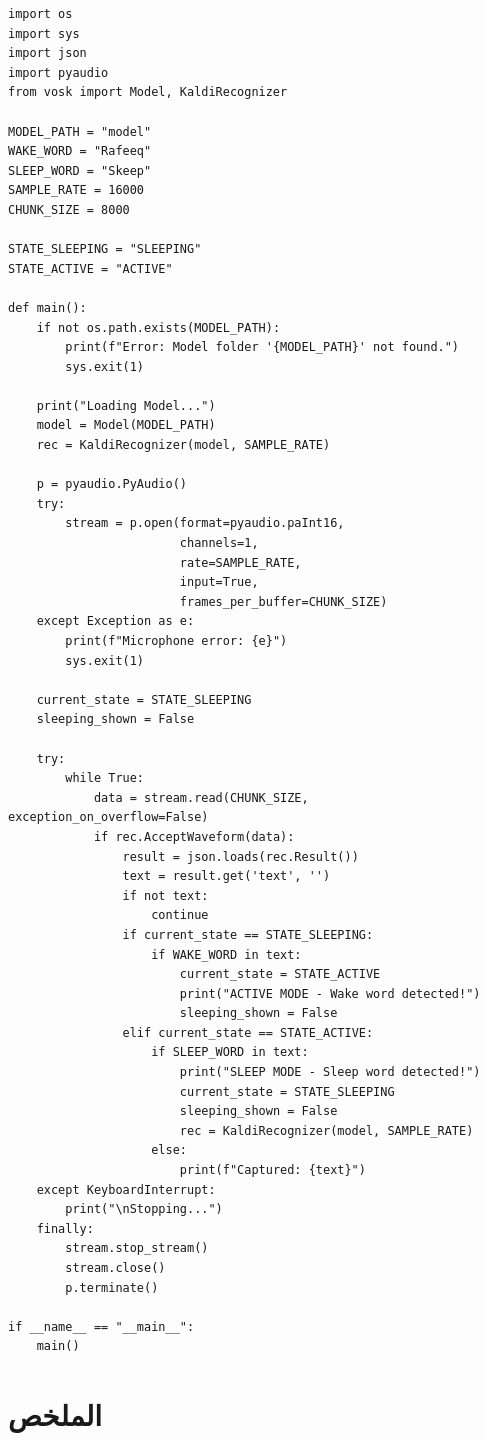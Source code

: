 \documentclass[12pt,a4paper]{report}
\begin{document}
\lstset{style=pythonstyle}
\begin{lstlisting}[caption={Voice-controlled robot Python script using Vosk}]
import os
import sys
import json
import pyaudio
from vosk import Model, KaldiRecognizer

MODEL_PATH = "model"
WAKE_WORD = "Rafeeq"
SLEEP_WORD = "Skeep"
SAMPLE_RATE = 16000
CHUNK_SIZE = 8000

STATE_SLEEPING = "SLEEPING"
STATE_ACTIVE = "ACTIVE"

def main():
    if not os.path.exists(MODEL_PATH):
        print(f"Error: Model folder '{MODEL_PATH}' not found.")
        sys.exit(1)

    print("Loading Model...")
    model = Model(MODEL_PATH)
    rec = KaldiRecognizer(model, SAMPLE_RATE)

    p = pyaudio.PyAudio()
    try:
        stream = p.open(format=pyaudio.paInt16,
                        channels=1,
                        rate=SAMPLE_RATE,
                        input=True,
                        frames_per_buffer=CHUNK_SIZE)
    except Exception as e:
        print(f"Microphone error: {e}")
        sys.exit(1)

    current_state = STATE_SLEEPING
    sleeping_shown = False

    try:
        while True:
            data = stream.read(CHUNK_SIZE, exception_on_overflow=False)
            if rec.AcceptWaveform(data):
                result = json.loads(rec.Result())
                text = result.get('text', '')
                if not text:
                    continue
                if current_state == STATE_SLEEPING:
                    if WAKE_WORD in text:
                        current_state = STATE_ACTIVE
                        print("ACTIVE MODE - Wake word detected!")
                        sleeping_shown = False
                elif current_state == STATE_ACTIVE:
                    if SLEEP_WORD in text:
                        print("SLEEP MODE - Sleep word detected!")
                        current_state = STATE_SLEEPING
                        sleeping_shown = False
                        rec = KaldiRecognizer(model, SAMPLE_RATE)
                    else:
                        print(f"Captured: {text}")
    except KeyboardInterrupt:
        print("\nStopping...")
    finally:
        stream.stop_stream()
        stream.close()
        p.terminate()

if __name__ == "__main__":
    main()
\end{lstlisting}
\chapter*{\raggedleft \textarabic{الملخص}}
\end{document}
